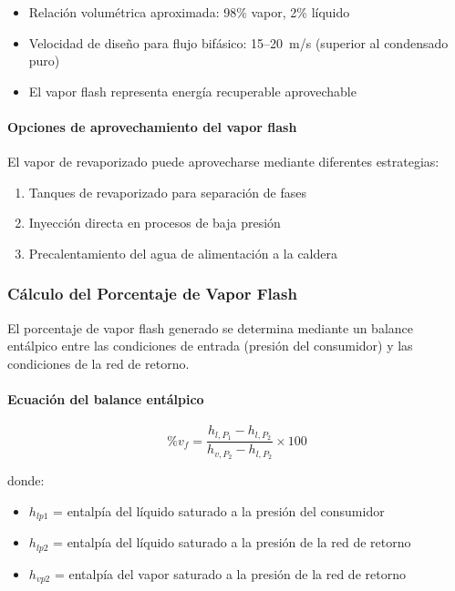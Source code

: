 \documentclass[12pt]{article}
\begin{document}
\begin{itemize}[noitemsep]
	\item Relación volumétrica aproximada: 98\% vapor, 2\% líquido
	\item Velocidad de diseño para flujo bifásico: 15--20~m/s (superior al condensado puro)
	\item El vapor flash representa energía recuperable aprovechable
\end{itemize}

\paragraph{Opciones de aprovechamiento del vapor flash}

El vapor de revaporizado puede aprovecharse mediante diferentes estrategias:

\begin{enumerate}[noitemsep]
	\item Tanques de revaporizado para separación de fases
	\item Inyección directa en procesos de baja presión
	\item Precalentamiento del agua de alimentación a la caldera
\end{enumerate}

\subsubsection{Cálculo del Porcentaje de Vapor Flash}
\label{subsubsec:calculo-vapor-flash}

El porcentaje de vapor flash generado se determina mediante un balance entálpico entre las condiciones de entrada (presión del consumidor) y las condiciones de la red de retorno.

\paragraph{Ecuación del balance entálpico}

\begin{equation}
	\%v_f = \frac{h_{l,P_1} - h_{l,P_2}}{h_{v,P_2} - h_{l,P_2}} \times 100
	\label{eq:vapor-flash}
\end{equation}

donde:
\begin{itemize}[noitemsep]
	\item $h_{lp1}$ = entalpía del líquido saturado a la presión del consumidor
	\item $h_{lp2}$ = entalpía del líquido saturado a la presión de la red de retorno
	\item $h_{vp2}$ = entalpía del vapor saturado a la presión de la red de retorno
\end{itemize}
\end{document}
